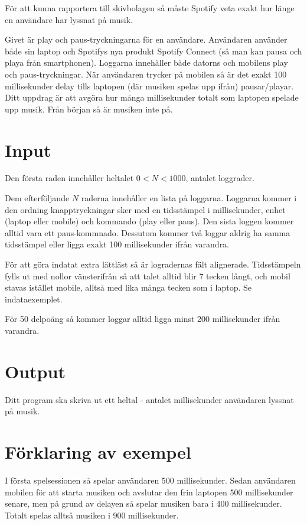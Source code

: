 
För att kunna rapportera till skivbolagen så måste Spotify veta exakt hur länge
en användare har lyssnat på musik.

Givet är play och paus-tryckningarna för en användare. Användaren
använder både sin laptop och Spotifys nya produkt Spotify Connect (så
man kan pausa och playa från smartphonen). Loggarna innehåller både
datorns och mobilens play och paus-tryckningar. När användaren trycker
på mobilen så är det exakt 100 millisekunder delay tills laptopen
(där musiken spelas upp ifrån) pausar/playar. Ditt uppdrag är att
avgöra hur många millisekunder totalt som laptopen spelade upp musik.
Från början så är musiken inte på.

\section*{Input}
Den första raden innehåller heltalet $0 < N < 1000$, antalet loggrader.

Dem efterföljande $N$ raderna innehåller en lista på loggarna. Loggarna kommer
i den ordning knapptryckningar sker med en tidsstämpel i millisekunder, enhet
(laptop eller mobile) och kommando (play eller paus). Den sista loggen kommer
alltid vara ett paus-kommnado. Dessutom kommer två loggar aldrig ha samma
tidsstämpel eller ligga exakt 100 millisekunder ifrån varandra.

För att göra indatat extra lättläst så är logradernas fält
alignerade. Tidsstämpeln fylls ut med nollor vänsterifrån så att talet
alltid blir 7 tecken långt, och mobil stavas istället mobile, alltså med lika
många tecken som i laptop. Se indataexemplet.

För 50 delpoäng så kommer loggar alltid ligga minst 200 millisekunder ifrån varandra.

\section*{Output}
Ditt program ska skriva ut ett heltal - antalet millisekunder användaren lyssnat på musik.

\section*{Förklaring av exempel}

I första spelsessionen så spelar användaren 500 millisekunder. Sedan användaren
mobilen för att starta musiken och avslutar den frin laptopen 500 millisekunder
senare, men på grund av delayen så spelar musiken bara i 400 millisekunder.
Totalt spelas alltså musiken i 900 millisekunder.
